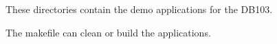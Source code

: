 These directories contain the demo applications for the D\+B103.

The makefile can clean or build the applications. 